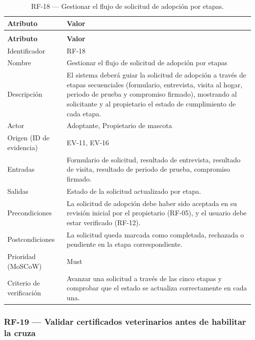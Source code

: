 \documentclass[journal,onecolumn]{IEEEtran}
\makeatletter
\newenvironment{atributos}[2]{%
	\small
	\begin{longtable}{@{}>{\raggedright\arraybackslash}p{4.2cm} >{\raggedright\arraybackslash}p{11.2cm}@{}}
		\caption{#2}\label{tab:#1}\\
		\toprule
		\textbf{Atributo} & \textbf{Valor} \\
		\midrule
		\endfirsthead
		\multicolumn{2}{@{}l}{\small\itshape (continuación)}\\
		\toprule
		\textbf{Atributo} & \textbf{Valor} \\
		\midrule
		\endhead
		\bottomrule
		\endlastfoot
	}{%
	\end{longtable}
	\normalsize
}
\makeatother
\begin{document}
	\begin{atributos}{RF-18}{RF-18 --- Gestionar el flujo de solicitud de adopción por etapas.}
		Identificador & RF-18 \\
		Nombre & Gestionar el flujo de solicitud de adopción por etapas \\
		Descripción & El sistema deberá guiar la solicitud de adopción a través de etapas secuenciales (formulario, entrevista, visita al hogar, periodo de prueba y compromiso firmado), mostrando al solicitante y al propietario el estado de cumplimiento de cada etapa. \\
		Actor & Adoptante, Propietario de mascota \\
		Origen (ID de evidencia) & EV-11, EV-16 \\
		Entradas & Formulario de solicitud, resultado de entrevista, resultado de visita, resultado de periodo de prueba, compromiso firmado. \\
		Salidas & Estado de la solicitud actualizado por etapa. \\
		Precondiciones & La solicitud de adopción debe haber sido aceptada en su revisión inicial por el propietario (RF-05), y el usuario debe estar verificado (RF-12). \\
		Postcondiciones & La solicitud queda marcada como completada, rechazada o pendiente en la etapa correspondiente. \\
		Prioridad (MoSCoW) & Must \\
		Criterio de verificación & Avanzar una solicitud a través de las cinco etapas y comprobar que el estado se actualiza correctamente en cada una. \\
	\end{atributos}
	
	\subsubsection{RF-19 --- Validar certificados veterinarios antes de habilitar la cruza}
	
\end{document}
